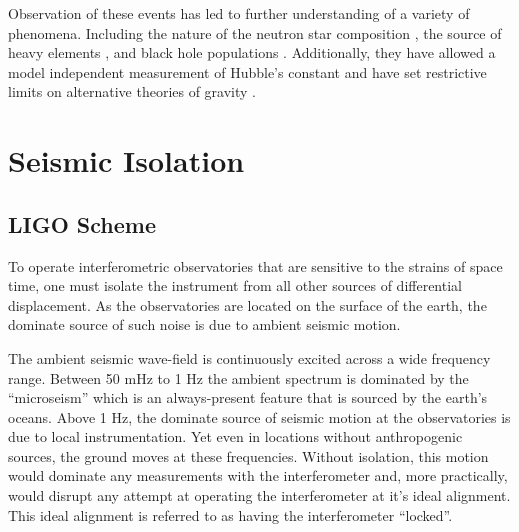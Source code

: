 \documentclass [12pt, proquest]{uwthesis}[2019]
\begin{document}
Observation of these events has led to further understanding of a variety of phenomena. Including the nature of the neutron star composition \cite{NSEoS}, the source of heavy elements \cite{heavyElements}, and black hole populations \cite{GWTC}. Additionally, they have allowed a model independent measurement of Hubble's constant \cite{hubble1, hubble2} and have set restrictive limits on alternative theories of gravity \cite{speedGW}.

\section{Seismic Isolation}\label{seisIso}

\subsection{LIGO Scheme}

To operate interferometric observatories that are sensitive to the strains of space time, one must isolate the instrument from all other sources of differential displacement. As the observatories are located on the surface of the earth, the dominate source of such noise is due to ambient seismic motion. 

The ambient seismic wave-field is continuously excited across a wide frequency range. Between 50 mHz to 1 Hz the ambient spectrum is dominated by the ``microseism'' which is an always-present feature that is sourced by the earth's oceans. Above 1 Hz, the dominate source of seismic motion at the observatories is due to local instrumentation. Yet even in locations without anthropogenic sources, the ground moves at these frequencies. Without isolation, this motion would dominate any measurements with the interferometer and, more practically, would disrupt any attempt at operating the interferometer at it's ideal alignment. This ideal alignment is referred to as having the interferometer ``locked''.
\end{document}
